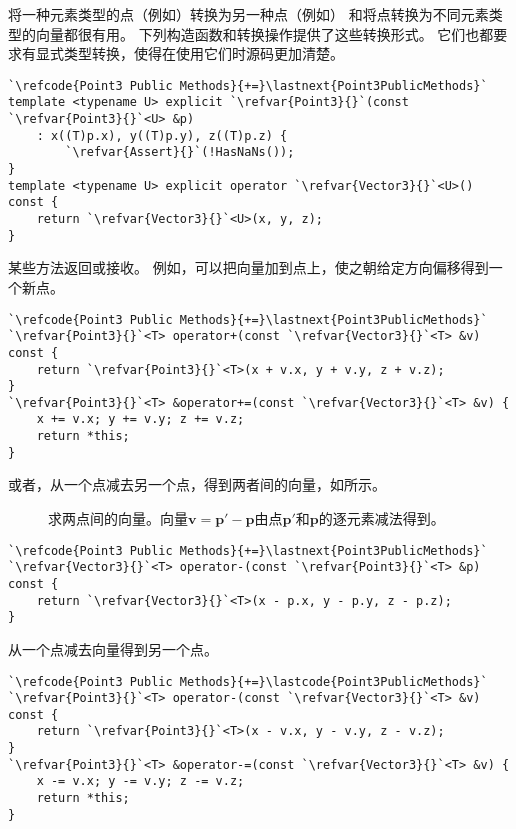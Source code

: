 将一种元素类型的点（例如）转换为另一种点（例如）
和将点转换为不同元素类型的向量都很有用。
下列构造函数和转换操作提供了这些转换形式。
它们也都要求有显式类型转换，使得在使用它们时源码更加清楚。
\begin{lstlisting}
`\refcode{Point3 Public Methods}{+=}\lastnext{Point3PublicMethods}`
template <typename U> explicit `\refvar{Point3}{}`(const `\refvar{Point3}{}`<U> &p)
    : x((T)p.x), y((T)p.y), z((T)p.z) { 
        `\refvar{Assert}{}`(!HasNaNs());
}
template <typename U> explicit operator `\refvar{Vector3}{}`<U>() const {
    return `\refvar{Vector3}{}`<U>(x, y, z);
}
\end{lstlisting}

某些方法返回或接收。
例如，可以把向量加到点上，使之朝给定方向偏移得到一个新点。
\begin{lstlisting}
`\refcode{Point3 Public Methods}{+=}\lastnext{Point3PublicMethods}`
`\refvar{Point3}{}`<T> operator+(const `\refvar{Vector3}{}`<T> &v) const {
    return `\refvar{Point3}{}`<T>(x + v.x, y + v.y, z + v.z);
}
`\refvar{Point3}{}`<T> &operator+=(const `\refvar{Vector3}{}`<T> &v) {
    x += v.x; y += v.y; z += v.z;
    return *this;
}
\end{lstlisting}

或者，从一个点减去另一个点，得到两者间的向量，如所示。
\begin{figure}[htbp]
    \centering
    \caption{求两点间的向量。向量$\bm v=\bm p'-\bm p$由点$\bm p'$和$\bm p$的逐元素减法得到。}
    \label{fig:2.6}
\end{figure}

\begin{lstlisting}
`\refcode{Point3 Public Methods}{+=}\lastnext{Point3PublicMethods}`
`\refvar{Vector3}{}`<T> operator-(const `\refvar{Point3}{}`<T> &p) const {
    return `\refvar{Vector3}{}`<T>(x - p.x, y - p.y, z - p.z);
}
\end{lstlisting}

从一个点减去向量得到另一个点。
\begin{lstlisting}
`\refcode{Point3 Public Methods}{+=}\lastcode{Point3PublicMethods}`
`\refvar{Point3}{}`<T> operator-(const `\refvar{Vector3}{}`<T> &v) const {
    return `\refvar{Point3}{}`<T>(x - v.x, y - v.y, z - v.z);
}
`\refvar{Point3}{}`<T> &operator-=(const `\refvar{Vector3}{}`<T> &v) {
    x -= v.x; y -= v.y; z -= v.z;
    return *this;
}
\end{lstlisting}

